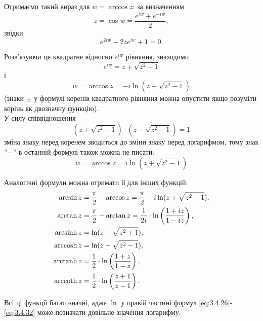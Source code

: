 Отримаємо такий вираз для $w = \arccos z$: за визначенням
\begin{equation}
	\label{eq:3.4.21}
	z = \cos w = \dfrac{e^{iw} + e^{-iw}}{2},
\end{equation}
звідки 
\begin{equation}
	\label{eq:3.4.22}
	e^{2 i w} - 2 z e^{i w} + 1 = 0.
\end{equation}

Розв'язуючи це квадратне відносно $e^{i w}$ рівняння, знаходимо
\begin{equation}
	\label{eq:3.4.23}
	e^{i w} = z + \sqrt{z^2 - 1}
\end{equation}
і
\begin{equation}
	\label{eq:3.4.24}
	w = \arccos z = -i \ln (z + \sqrt{z^2 - 1})
\end{equation}
(знаки $\pm$ у формулі коренів квадратного рівняння можна опустити якщо розуміти корінь як двозначну функцію). \\

У силу співвідношення
\begin{equation}
	\label{eq:3.4.25}
	(z + \sqrt{z^2 - 1}) \cdot (z - \sqrt{z^2 - 1}) = 1
\end{equation}
зміна знаку перед коренем зводиться до зміни знаку перед логарифмом, тому знак ''$-$'' в останній формулі також можна не писати:
\begin{equation}
	\label{eq:3.4.26}
	w = \arccos z = i \ln (z + \sqrt{z^2 - 1})
\end{equation}

Аналогічні формули можна отримати й для інших функцій:
\begin{align}
	\label{eq:3.4.27}
	\arcsin z &= \dfrac{\pi}{2} - \arccos z = \dfrac{\pi}{2} - i \ln (z + \sqrt{z^2 - 1}), \\
	\label{eq:3.4.28}
	\arctan z &= \dfrac{\pi}{2} - \arctan z = \dfrac{1}{2 i} \cdot \ln \left( \dfrac{1 + i z}{1 - i z} \right), \\
	\label{eq:3.4.29}
	\operatorname{arcsinh} z &= \ln (z + \sqrt{z^2 + 1}), \\
	\label{eq:3.4.30}
	\operatorname{arccosh} z &= \ln (z + \sqrt{z^2 - 1}), \\
	\label{eq:3.4.31}
	\operatorname{arctanh} z &= \dfrac 12 \cdot \ln \left( \dfrac{1 + z}{1 - z} \right), \\
	\label{eq:3.4.32}
	\operatorname{arccoth} z &= \dfrac 12 \cdot \ln \left( \dfrac{z + 1}{z - 1} \right).
\end{align}

Всі ці функції багатозначні, адже $\ln$ у правій частині формул \eqref{eq:3.4.26}-\eqref{eq:3.4.32} може позначати довільне значення логарифму. \\

